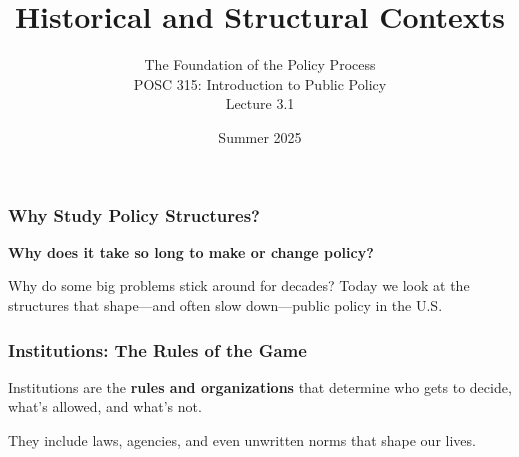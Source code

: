 \documentclass[10pt]{beamer}
\begin{document}
\title{Historical and Structural Contexts}
\subtitle{The Foundation of the Policy Process\\POSC 315: Introduction to Public Policy\\Lecture 3.1}
\date{Summer 2025}

\maketitle

\begin{frame}
\frametitle{Why Study Policy Structures?}

\begin{block}{}
\textbf{Why does it take so long to make or change policy?}

Why do some big problems stick around for decades? Today we look at the structures that shape---and often slow down---public policy in the U.S.
\end{block}

\end{frame}

\begin{frame}
\frametitle{Institutions: The Rules of the Game}

\begin{block}{}
Institutions are the \textbf{rules and organizations} that determine who gets to decide, what's allowed, and what's not.

They include laws, agencies, and even unwritten norms that shape our lives.
\end{block}

\end{frame}
\end{document}
